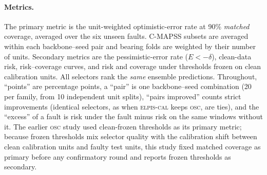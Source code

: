 \documentclass{esannV2}
\newcommand{\OSC}{\textsc{osc}}
\newcommand{\AUTO}{\textsc{elpis-cal}}
\begin{document}
\paragraph{Metrics.} The primary metric is the unit-weighted optimistic-error rate at 90\% \emph{matched} coverage, averaged over the six unseen faults. C-MAPSS subsets are averaged within each backbone--seed pair and bearing folds are weighted by their number of units. Secondary metrics are the pessimistic-error rate ($E<-\delta$), clean-data risk, risk--coverage curves, and risk and coverage under thresholds frozen on clean calibration units. All selectors rank the \emph{same} ensemble predictions. Throughout, ``points'' are percentage points, a ``pair'' is one backbone--seed combination (20 per family, from 10 independent unit splits), ``pairs improved'' counts strict improvements (identical selectors, as when \AUTO{} keeps \OSC, are ties), and the ``excess'' of a fault is risk under the fault minus risk on the same windows without it. The earlier \OSC{} study used clean-frozen thresholds as its primary metric; because frozen thresholds mix selector quality with the calibration shift between clean calibration units and faulty test units, this study fixed matched coverage as primary before any confirmatory round and reports frozen thresholds as secondary.
\end{document}
